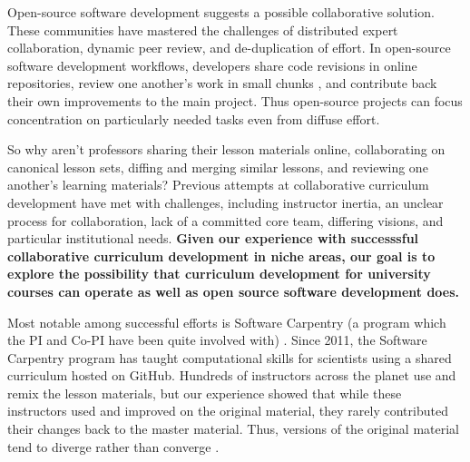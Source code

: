 \documentclass[11pt]{article}
\begin{document}
          Open-source software development suggests a possible collaborative solution.
          These communities have mastered the challenges of distributed expert collaboration, 
          dynamic peer review, and de-duplication of effort. In open-source 
          software development workflows, developers share code revisions in online repositories, 
          review one another's work in small chunks \cite{wilson_best_2014}, 
          and contribute back their own improvements to the main project.
          Thus open-source projects can focus concentration on particularly needed tasks
          even from diffuse effort.

          So why aren't professors sharing their lesson materials online, 
          collaborating on canonical lesson sets, diffing and merging similar 
          lessons, and reviewing one another's learning materials?
          Previous attempts at collaborative curriculum development have met with 
          challenges, including instructor inertia, an unclear process for collaboration,
          lack of a committed core team, differing visions, and particular institutional needs.
          \textbf{Given our experience with successsful collaborative curriculum development
          in niche areas, our goal is to explore the possibility that curriculum development for 
          university courses can operate as well as open source software development 
          does.}
          
          Most notable among successful efforts is Software Carpentry (a program
          which the PI and Co-PI have been quite involved with) 
          \cite{wilson_software_2014}.  Since 2011, the Software Carpentry program has taught 
          computational skills for scientists using a shared curriculum hosted 
          on GitHub. Hundreds of instructors across the planet use and remix 
          the lesson materials, but our experience showed that while these 
          instructors used and improved on the original material, they rarely 
          contributed their changes back to the master material. Thus, versions 
          of the original material tend to diverge rather than converge 
          \cite{wilson_software_2014,wilson_software_2014-1}.
          
\end{document}

